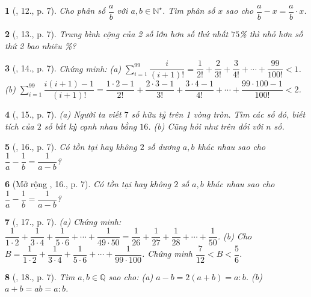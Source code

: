 \documentclass{article}
\newtheorem{baitoan}{}
\begin{document}
\begin{baitoan}[\cite{Binh_Toan_7_tap_1}, 12., p. 7]
	Cho phân số $\dfrac{a}{b}$ với $a,b\in\mathbb{N}^\star$. Tìm phân số $x$ sao cho $\dfrac{a}{b} - x = \dfrac{a}{b}\cdot x$.
\end{baitoan}

\begin{baitoan}[\cite{Binh_Toan_7_tap_1}, 13., p. 7]
	Trung bình cộng của 2 số lớn hơn số thứ nhất $75$\% thì nhỏ hơn số thứ 2 bao nhiêu \%?
\end{baitoan}

\begin{baitoan}[\cite{Binh_Toan_7_tap_1}, 14., p. 7]
	Chứng minh: (a) $\sum_{i=1}^{99} \dfrac{i}{(i+1)!} = \dfrac{1}{2!} + \dfrac{2}{3!} + \dfrac{3}{4!} + \cdots + \dfrac{99}{100!} < 1$. (b) $\sum_{i=1}^{99} \dfrac{i(i + 1) - 1}{(i+1)!} = \dfrac{1\cdot 2 - 1}{2!} + \dfrac{2\cdot 3 - 1}{3!} + \dfrac{3\cdot 4 - 1}{4!} + \cdots + \dfrac{99\cdot 100 - 1}{100!} < 2$.	
\end{baitoan}

\begin{baitoan}[\cite{Binh_Toan_7_tap_1}, 15., p. 7]
	(a) Người ta viết $7$ số hữu tỷ trên 1 vòng tròn. Tìm các số đó, biết tích của $2$ số bất kỳ cạnh nhau bằng $16$. (b) Cũng hỏi như trên đối với $n$ số.
\end{baitoan}

\begin{baitoan}[\cite{Binh_Toan_7_tap_1}, 16., p. 7]
	Có tồn tại hay không $2$ số dương $a,b$ khác nhau sao cho $\dfrac{1}{a} - \dfrac{1}{b} = \dfrac{1}{a - b}$?
\end{baitoan}

\begin{baitoan}[Mở rộng \cite{Binh_Toan_7_tap_1}, 16., p. 7]
	Có tồn tại hay không $2$ số $a,b$ khác nhau sao cho $\dfrac{1}{a} - \dfrac{1}{b} = \dfrac{1}{a - b}$?
\end{baitoan}

\begin{baitoan}[\cite{Binh_Toan_7_tap_1}, 17., p. 7]
	(a) Chứng minh: $\dfrac{1}{1\cdot 2} + \dfrac{1}{3\cdot 4} + \dfrac{1}{5\cdot 6} + \cdots + \dfrac{1}{49\cdot 50} = \dfrac{1}{26} + \dfrac{1}{27} + \dfrac{1}{28} + \cdots + \dfrac{1}{50}$. (b) Cho $B = \dfrac{1}{1\cdot 2} + \dfrac{1}{3\cdot 4} + \dfrac{1}{5\cdot 6} + \cdots + \dfrac{1}{99\cdot 100}$. Chứng minh $\dfrac{7}{12} < B < \dfrac{5}{6}$.		
\end{baitoan}

\begin{baitoan}[\cite{Binh_Toan_7_tap_1}, 18., p. 7]
	Tìm $a,b\in\mathbb{Q}$ sao cho: (a) $a - b = 2(a + b) = a:b$. (b) $a + b = ab = a:b$.
\end{baitoan}
\end{document}

